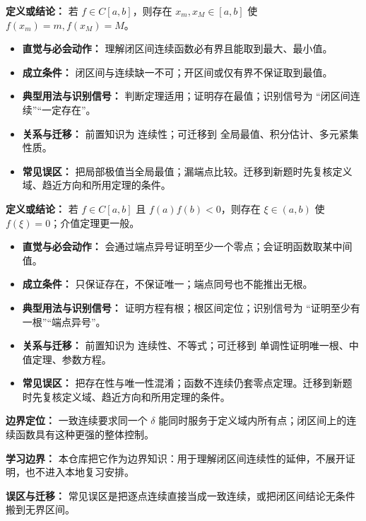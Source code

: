 \begin{knowledgeBox}
\textbf{定义或结论：} 若 $f\in C[a,b]$，则存在 $x_m,x_M\in[a,b]$ 使 $f(x_m)=m,f(x_M)=M$。

\begin{itemize}
  \item \textbf{直觉与必会动作：} 理解闭区间连续函数必有界且能取到最大、最小值。
  \item \textbf{成立条件：} 闭区间与连续缺一不可；开区间或仅有界不保证取到最值。
  \item \textbf{典型用法与识别信号：} 判断定理适用；证明存在最值；识别信号为 “闭区间连续”“一定存在”。
  \item \textbf{关系与迁移：} 前置知识为 连续性；可迁移到 全局最值、积分估计、多元紧集性质。
  \item \textbf{常见误区：} 把局部极值当全局最值；漏端点比较。迁移到新题时先复核定义域、趋近方向和所用定理的条件。
\end{itemize}
\end{knowledgeBox}

\begin{knowledgeBox}
\textbf{定义或结论：} 若 $f\in C[a,b]$ 且 $f(a)f(b)<0$，则存在 $\xi\in(a,b)$ 使 $f(\xi)=0$；介值定理更一般。

\begin{itemize}
  \item \textbf{直觉与必会动作：} 会通过端点异号证明至少一个零点；会证明函数取某中间值。
  \item \textbf{成立条件：} 只保证存在，不保证唯一；端点同号也不能推出无根。
  \item \textbf{典型用法与识别信号：} 证明方程有根；根区间定位；识别信号为 “证明至少有一根”“端点异号”。
  \item \textbf{关系与迁移：} 前置知识为 连续性、不等式；可迁移到 单调性证明唯一根、中值定理、参数方程。
  \item \textbf{常见误区：} 把存在性与唯一性混淆；函数不连续仍套零点定理。迁移到新题时先复核定义域、趋近方向和所用定理的条件。
\end{itemize}
\end{knowledgeBox}

\begin{knowledgeBox}
\textbf{边界定位：} 一致连续要求同一个 $\delta$ 能同时服务于定义域内所有点；闭区间上的连续函数具有这种更强的整体控制。

\textbf{学习边界：} 本仓库把它作为边界知识：用于理解闭区间连续性的延伸，不展开证明，也不进入本地复习安排。

\textbf{误区与迁移：} 常见误区是把逐点连续直接当成一致连续，或把闭区间结论无条件搬到无界区间。
\end{knowledgeBox}

